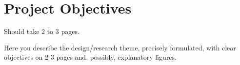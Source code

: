 \chapter{Project Objectives}\label{ch:obiective}
\pagestyle{fancy}

{\noindent\color{blue}Should take 2 to 3 pages.\\}

Here you describe the design/research theme, precisely formulated, with clear objectives on 2-3 pages and, possibly, explanatory figures.


